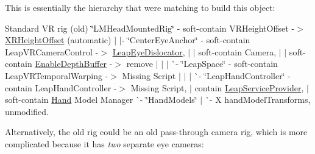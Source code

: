 This is essentially the hierarchy that we\textquotesingle{}re matching to build this object\+:

Standard VR rig (old) \char`\"{}\+L\+M\+Head\+Mounted\+Rig\char`\"{} -\/ soft-\/contain V\+R\+Height\+Offset -\/$>$ \mbox{\hyperlink{class_leap_1_1_unity_1_1_x_r_height_offset}{X\+R\+Height\+Offset}} (automatic) $\vert$ $\vert$-\/ \char`\"{}\+Center\+Eye\+Anchor\char`\"{} -\/ soft-\/contain Leap\+V\+R\+Camera\+Control -\/$>$ \mbox{\hyperlink{class_leap_1_1_unity_1_1_leap_eye_dislocator}{Leap\+Eye\+Dislocator}}, $\vert$ $\vert$ soft-\/contain Camera, $\vert$ $\vert$ soft-\/contain \mbox{\hyperlink{class_leap_1_1_unity_1_1_enable_depth_buffer}{Enable\+Depth\+Buffer}} -\/$>$ remove $\vert$ $\vert$ $\vert$ \`{}-\/ \char`\"{}\+Leap\+Space\char`\"{} -\/ soft-\/contain Leap\+V\+R\+Temporal\+Warping -\/$>$ Missing Script $\vert$ $\vert$ $\vert$ \`{}-\/ \char`\"{}\+Leap\+Hand\+Controller\char`\"{} -\/ contain Leap\+Hand\+Controller -\/$>$ Missing Script, $\vert$ contain \mbox{\hyperlink{class_leap_1_1_unity_1_1_leap_service_provider}{Leap\+Service\+Provider}}, $\vert$ soft-\/contain \mbox{\hyperlink{class_leap_1_1_hand}{Hand}} Model Manager \`{}-\/ \char`\"{}\+Hand\+Models\char`\"{} $\vert$ \`{}-\/ X hand\+Model\+Transforms, unmodified.

Alternatively, the old rig could be an old pass-\/through camera rig, which is more complicated because it has {\itshape two} separate eye cameras\+:

